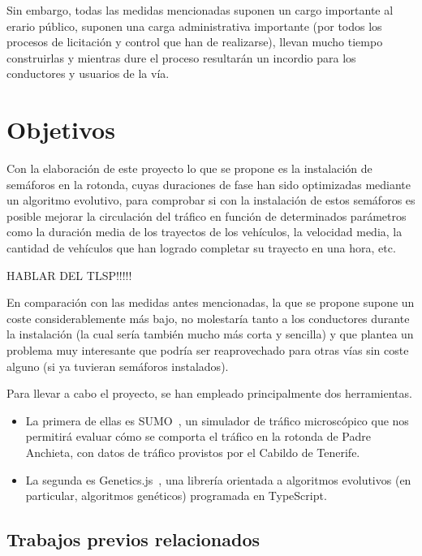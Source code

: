 Sin embargo, todas las medidas mencionadas suponen un cargo importante al erario público, suponen una carga administrativa importante (por todos los procesos de licitación y control que han de realizarse), llevan mucho tiempo construirlas y mientras dure el proceso resultarán un incordio para los conductores y usuarios de la vía.

\section{Objetivos}

Con la elaboración de este proyecto lo que se propone es la instalación de semáforos en la rotonda, cuyas duraciones de fase han sido optimizadas mediante un algoritmo evolutivo, para comprobar si con la instalación de estos semáforos es posible mejorar la circulación del tráfico en función de determinados parámetros como la duración media de los trayectos de los vehículos, la velocidad media, la cantidad de vehículos que han logrado completar su trayecto en una hora, etc.


{\color{BurntOrange} HABLAR DEL TLSP!!!!!}


En comparación con las medidas antes mencionadas, la que se propone supone un coste considerablemente más bajo, no molestaría tanto a los conductores durante la instalación (la cual sería también mucho más corta y sencilla) y que plantea un problema muy interesante que podría ser reaprovechado para otras vías sin coste alguno (si ya tuvieran semáforos instalados).

Para llevar a cabo el proyecto, se han empleado principalmente dos herramientas.

\begin{itemize}
    \item La primera de ellas es SUMO~\cite{lopez_microscopic_2018}, un simulador de tráfico microscópico que nos permitirá evaluar cómo se comporta el tráfico en la rotonda de Padre Anchieta, con datos de tráfico provistos por el Cabildo de Tenerife.
    \item La segunda es Genetics.js~\cite{abrante_dorta_framework_2019}, una librería orientada a algoritmos evolutivos (en particular, algoritmos genéticos) programada en TypeScript.
\end{itemize}

\subsection{Trabajos previos relacionados}

